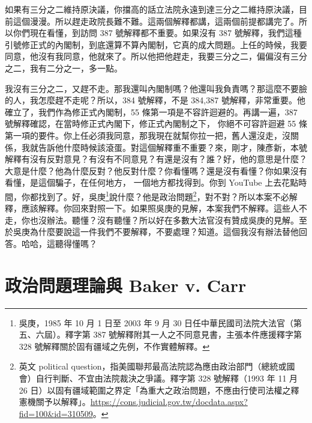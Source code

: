 \hypertarget{c08:cue:29}{}如果有三分之二維持原決議，你擋高的話立法院永遠到達三分之二維持原決議，目前這個漫漫。所以趕走政院長難不難。這兩個解釋都講，這兩個前提都講完了。所以你們現在看懂，到訪問 387 號解釋都不重要。如果沒有 387 號解釋，我們這種引號修正式的內閣制，到底還算不算內閣制，它真的成大問題。上任的時候，我要同意，他沒有我同意，他就來了。所以他把他趕走，我要三分之二，偏偏沒有三分之二，我有二分之一，多一點。

\hypertarget{c08:cue:30}{}我沒有三分之二，又趕不走。那我還叫內閣制嗎？他還叫我負責嗎？那這麼不要臉的人，我怎麼趕不走呢？所以，384 號解釋，不是 384,387 號解釋，非常重要。他確立了，我們作為修正式內閣制，55 條第一項是不容許迴避的。再講一遍，387 號解釋確認，在當時修正式內閣下，修正式內閣制之下，
\hypertarget{c08:cue:31}{}你絕不可容許迴避 55 條第一項的要件。你上任必須我同意，那我現在就幫你拉一把，舊人還沒走，沒關係，我就告訴他什麼時候該滾蛋。對這個解釋重不重要？來，剛才，陳彥新，本號解釋有沒有反對意見？有沒有不同意見？有還是沒有？誰？好，他的意思是什麼？大意是什麼？他為什麼反對？他反對什麼？你看懂嗎？還是沒有看懂？你如果沒有看懂，是這個騙子，在任何地方，
\hypertarget{c08:cue:32}{}一個地方都找得到。你到 YouTube 上去花點時間，你都找到了。好，吳庚\footnote{吳庚，1985 年 10 月 1 日至 2003 年 9 月 30 日任中華民國司法院大法官（第五、六屆）。釋字第 387 號解釋附其一人之不同意見書，主張本件應援釋字第 328 號解釋關於固有疆域之先例，不作實體解釋。}說什麼？他是政治問題\footnote{英文 political question，指美國聯邦最高法院認為應由政治部門（總統或國會）自行判斷、不宜由法院裁決之爭議。釋字第 328 號解釋（1993 年 11 月 26 日）以固有疆域範圍之界定「為重大之政治問題，不應由行使司法權之釋憲機關予以解釋」。\url{https://cons.judicial.gov.tw/docdata.aspx?fid=100&id=310509}。}，對不對？所以本案不必解釋，應該解釋。你回來對照一下。如果照吳庚的見解，本案我們不解釋。這些人不走，你也沒辦法。聽懂？沒有聽懂？所以好在多數大法官沒有贊成吳庚的見解。至於吳庚為什麼要說這一件我們不要解釋，不要處理？知道。這個我沒有辦法替他回答。哈哈，這聽得懂嗎？

\section{政治問題理論與 Baker v. Carr}

